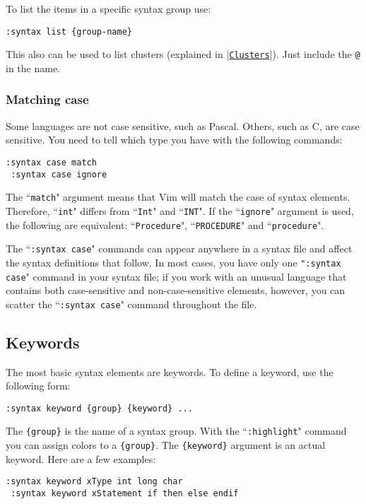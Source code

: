 To list the items in a specific syntax group use:

\begin{Verbatim}[samepage=true]
 :syntax list {group-name}
\end{Verbatim}

This also can be used to list clusters (explained in |\hyperref[Clusters]{\texttt{Clusters}}|).
Just include the \texttt{@} in the name.

\subsubsection{Matching case}
Some languages are not case sensitive, such as Pascal.
Others, such as C, are case sensitive.
You need to tell which type you have with the following commands:

\begin{Verbatim}[samepage=true]
 :syntax case match
 :syntax case ignore
\end{Verbatim}

The ``\texttt{match}" argument means that Vim will match the case of syntax elements.
Therefore, ``\texttt{int}" differs from ``\texttt{Int}" and ``\texttt{INT}".
If the ``\texttt{ignore}" argument is used, the following are equivalent: ``\texttt{Procedure}", ``\texttt{PROCEDURE}" and ``\texttt{procedure}".

The ``\texttt{:syntax case}" commands can appear anywhere in a syntax file and affect the syntax definitions that follow.
In most cases, you have only one \texttt{":syntax case}" command in your syntax file; if you work with an unusual language that contains both case-sensitive and non-case-sensitive elements, however, you can scatter the ``\texttt{:syntax case}" command throughout the file.
\subsection{Keywords}
The most basic syntax elements are keywords.
To define a keyword, use the following form:

\begin{Verbatim}[samepage=true]
 :syntax keyword {group} {keyword} ...
\end{Verbatim}

The \texttt{\{group\}} is the name of a syntax group.
With the ``\texttt{:highlight}" command you can assign colors to a \texttt{\{group\}}.
The \texttt{\{keyword\}} argument is an actual keyword.
Here are a few examples:

\begin{Verbatim}[samepage=true]
 :syntax keyword xType int long char
 :syntax keyword xStatement if then else endif
\end{Verbatim}


